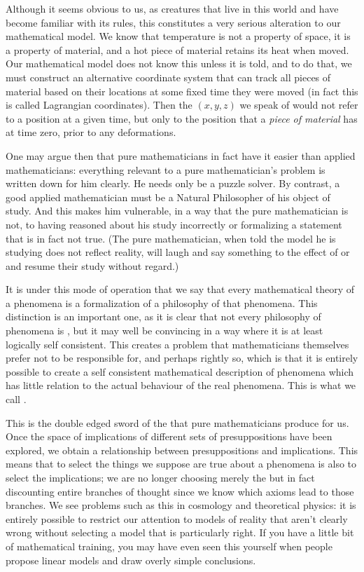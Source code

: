 \documentclass[11pt]{article}
\begin{document}
Although it seems obvious to us, as creatures that live in this world and have become familiar with its rules, this constitutes a very serious alteration to our mathematical model. We know that temperature is not a property of space, it is a property of material, and a hot piece of material retains its heat when moved. Our mathematical model does not know this unless it is told, and to do that, we must construct an alternative coordinate system that can track all pieces of material based on their locations at some fixed time  they were moved (in fact this is called Lagrangian coordinates). Then the $(x,y,z)$ we speak of would not refer to a position at a given time, but only to the position that a \emph{piece of material} has at time zero, prior to any deformations.

One may argue then that pure mathematicians in fact have it easier than applied mathematicians: everything relevant to a pure mathematician's problem is written down for him clearly. He needs only be a puzzle solver. By contrast, a good applied mathematician must be a Natural Philosopher of his object of study. And this makes him vulnerable, in a way that the pure mathematician is not, to having reasoned about his study incorrectly or formalizing a statement that is in fact not true. (The pure mathematician, when told the model he is studying does not reflect reality, will laugh and say something to the effect of  or  and resume their study without regard.)

It is under this mode of operation that we say that every mathematical theory of a phenomena is a formalization of a philosophy of that phenomena. This distinction is an important one, as it is clear that not every philosophy of phenomena is , but it may well be convincing in a way where it is at least logically self consistent. This creates a problem that mathematicians themselves prefer not to be responsible for, and perhaps rightly so, which is that it is entirely possible to create a self consistent mathematical description of phenomena which has little relation to the actual behaviour of the real phenomena. This is what we call .

This is the double edged sword of the  that pure mathematicians produce for us. Once the space of implications of different sets of presuppositions have been explored, we obtain a relationship between presuppositions and implications. This means that to select the things we suppose are true about a phenomena is also to select the implications; we are no longer choosing merely the  but in fact discounting entire branches of thought since we know which axioms lead to those branches. We see problems such as this in cosmology and theoretical physics: it is entirely possible to restrict our attention to models of reality that aren't clearly wrong without selecting a model that is particularly right. If you have a little bit of mathematical training, you may have even seen this yourself when people propose linear models and draw overly simple conclusions.
\end{document}
